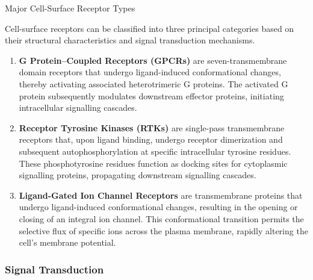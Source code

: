 \documentclass[10pt]{article}
\begin{document}
      \begin{core}[label=core:receptor_types]{Major Cell-Surface Receptor Types}

        Cell-surface receptors can be classified into three principal categories based on their structural characteristics and signal transduction mechanisms.

        \begin{enumerate}

          \item \textbf{G Protein–Coupled Receptors (GPCRs)} are seven-transmembrane domain receptors that undergo ligand-induced conformational changes, thereby activating associated heterotrimeric G proteins. The activated G protein subsequently modulates downstream effector proteins, initiating intracellular signalling cascades.


          \item \textbf{Receptor Tyrosine Kinases (RTKs)} are single-pass transmembrane receptors that, upon ligand binding, undergo receptor dimerization and subsequent autophosphorylation at specific intracellular tyrosine residues. These phosphotyrosine residues function as docking sites for cytoplasmic signalling proteins, propagating downstream signalling cascades.


          \item \textbf{Ligand-Gated Ion Channel Receptors} are transmembrane proteins that undergo ligand-induced conformational changes, resulting in the opening or closing of an integral ion channel. This conformational transition permits the selective flux of specific ions across the plasma membrane, rapidly altering the cell's membrane potential.


        \end{enumerate}

      \end{core}

    \subsubsection{Signal Transduction}
\end{document}
